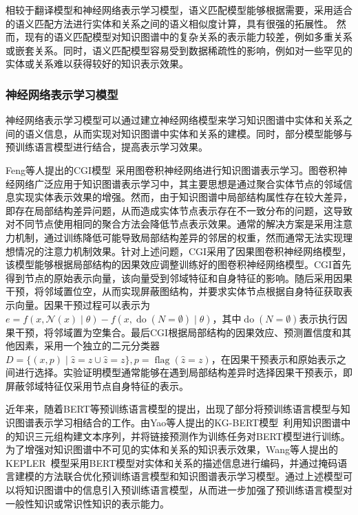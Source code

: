\documentclass[algorithmlist, AutoFakeBold, AutoFakeSlant, figurelist, tablelist, nomlist, engineering, openany]{seuthesix} %
\begin{document}
相较于翻译模型和神经网络表示学习模型，语义匹配模型能够根据需要，采用适合的语义匹配方法进行实体和关系之间的语义相似度计算，具有很强的拓展性。
然而，现有的语义匹配模型对知识图谱中的复杂关系的表示能力较差，例如多重关系或嵌套关系。同时，语义匹配模型容易受到数据稀疏性的影响，例如对一些罕见的实体或关系难以获得较好的知识表示效果。

\subsubsection{神经网络表示学习模型}
神经网络表示学习模型可以通过建立神经网络模型来学习知识图谱中实体和关系之间的语义信息，从而实现对知识图谱中实体和关系的建模。同时，部分模型能够与预训练语言模型进行结合，提高表示学习效果。

Feng等人提出的CGI模型~\cite{feng2021should}采用图卷积神经网络进行知识图谱表示学习。图卷积神经网络广泛应用于知识图谱表示学习中，其主要思想是通过聚合实体节点的邻域信息实现实体表示效果的增强。然而，由于知识图谱中局部结构属性存在较大差异，即存在局部结构差异问题，从而造成实体节点表示存在不一致分布的问题，这导致对不同节点使用相同的聚合方法会降低节点表示效果。通常的解决方案是采用注意力机制，通过训练降低可能导致局部结构差异的邻居的权重，然而通常无法实现理想情况的注意力机制效果。针对上述问题，CGI采用了因果图卷积神经网络模型，该模型能够根据局部结构的因果效应调整训练好的图卷积神经网络模型。CGI首先得到节点的原始表示向量，该向量受到邻域特征和自身特征的影响。随后采用因果干预，将邻域置位空，从而实现屏蔽图结构，并要求实体节点根据自身特征获取表示向量。因果干预过程可以表示为$e=f(x, \mathcal{N}(x) \mid \theta)-f(x, \operatorname{do}(N=\emptyset) \mid \theta)$，其中$\operatorname{do}(N=\emptyset)$表示执行因果干预，将邻域置为空集合。最后CGI根据局部结构的因果效应、预测置信度和其他因素，采用一个独立的二元分类器$D=\{(x, p) \mid \hat{z}=z \cup \hat{z}=z\}, p=\operatorname{flag}(\hat{z}=z)$，在因果干预表示和原始表示之间进行选择。实验证明模型通常能够在遇到局部结构差异时选择因果干预表示，即屏蔽邻域特征仅采用节点自身特征的表示。

近年来，随着BERT等预训练语言模型的提出，出现了部分将预训练语言模型与知识图谱表示学习相结合的工作。由Yao等人提出的KG-BERT模型~\cite{yao2019kg}利用知识图谱中的知识三元组构建文本序列，并将链接预测作为训练任务对BERT模型进行训练。为了增强对知识图谱中不可见的实体和关系的知识表示效果，Wang等人提出的KEPLER~\cite{wang2021kepler}模型采用BERT模型对实体和关系的描述信息进行编码，并通过掩码语言建模的方法联合优化预训练语言模型和知识图谱表示学习模型。通过上述模型可以将知识图谱中的信息引入预训练语言模型，从而进一步加强了预训练语言模型对一般性知识或常识性知识的表示能力。
\end{document}
